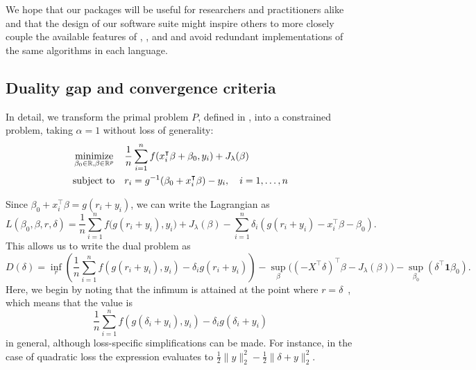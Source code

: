 \documentclass[article]{jss}
\let\Cref\crtCref
\begin{document}
We hope that our packages will be useful for researchers and
practitioners alike and that the design of our software suite
might inspire others to more closely couple the available features
of , , and  and avoid
redundant implementations of the same algorithms in each language.



\newpage

\begin{appendix}

  \section{Duality gap and convergence criteria}
  \label{sec:convergence-criteria-details}

  In detail, we transform the primal problem \(P\), defined in \Cref{eq:slope}, into a
  constrained problem, taking \(\alpha = 1\) without loss of generality:
  \begin{equation}
    \label{eq:slope-constrained}
    \begin{aligned}
       & \operatorname*{minimize}_{\beta_0 \in \mathbb{R},\beta \in \mathbb{R}^p} &  & \frac{1}{n} \sum_{i=1}^n f(x_i^\intercal \beta + \beta_0, y_i) + J_{\lambda}(\beta) \\
       & \text{subject to}                                         &  & r_i = g^{-1}(\beta_0 + x_i^\intercal \beta) - y_i, \quad i = 1, \ldots, n           \\
    \end{aligned}
  \end{equation}

  Since \(\beta_0 + x_i^\intercal \beta = g(r_i + y_i)\), we can write the Lagrangian as
  \[
    L(\beta_0,\beta,r,\delta) = \frac{1}{n} \sum_{i=1}^n f\big(g(r_i + y_i), y_i\big) + J_{\lambda}(\beta) - \sum_{i=1}^n \delta_i \left(g(r_i + y_i) - x_i^\intercal \beta - \beta_0 \right).
  \]
  This allows us to write the dual problem as
  \[
    D(\delta)  = \inf_r\left( \frac{1}{n} \sum_{i=1}^n f\left(g(r_i+y_i), y_i\right) - \delta_i g(r_i+ y_i)\right)
    - \sup_\beta \big((-X^\intercal \delta)^\intercal \beta -  J_\lambda(\beta) \big)
    - \sup_{\beta_0} \left( \delta^\intercal \bm{1} \beta_0\right).
  \]
  Here, we begin by noting that the infimum is attained at the point where
  \(r = \delta\)~\citep{fercoq2015}, which means that the value is
  \[
    \frac{1}{n} \sum_{i=1}^n f\left(g(\delta_i+y_i), y_i\right) - \delta_i g(\delta_i + y_i)
  \]
  in general, although loss-specific simplifications can be made. For instance, in the case of
  quadratic loss the expression evaluates to \(\frac{1}{2} \lVert y \rVert_2^2 - \frac{1}{2} \lVert \delta + y \lVert^2_2 \).


\end{appendix}
\end{document}
